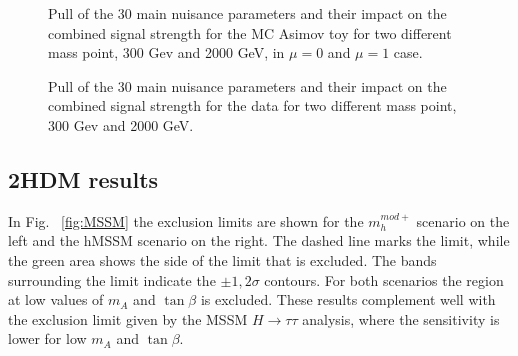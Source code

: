 \begin{figure}[htb]
\caption{Pull of the 30 main nuisance parameters and their impact on the combined signal strength for the MC Asimov toy for two different mass point, 300 Gev and 2000 GeV, in $\mu=0$ and $\mu=1$ case.}
    \label{fig:Impact_dataAsimov}
\end{figure}



\begin{figure}[htb]
\centering
{}

\caption{Pull of the 30 main nuisance parameters and their impact on the combined signal strength for the data for two different mass point, 300 Gev and 2000 GeV.}
    \label{fig:Impact_obs}
\end{figure}



\newpage
\clearpage

\subsection{2HDM results}

In Fig. ~\ref{fig:MSSM} the exclusion limits are shown for the $m_h^{mod+}$ scenario on the left and the hMSSM scenario on the right. The dashed line marks the limit, while the green area shows the side of the limit that is excluded. The bands surrounding the limit indicate the $\pm 1,2\sigma$ contours. For both scenarios the region at low values of $m_{A}$ and $\tan\beta$ is excluded. These results complement well with the exclusion limit given by the MSSM $H\rightarrow\tau\tau$ analysis, where the sensitivity is lower for low $m_{A}$ and $\tan\beta$.

